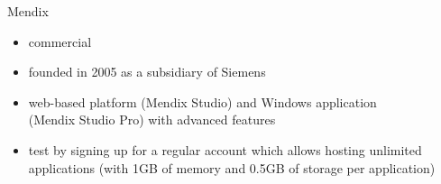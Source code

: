 \documentclass[aspectratio=169]{beamer}
\begin{document}
  \begin{frame}{Mendix}
    \begin{itemize}
      \item commercial
      \item founded in 2005 as a subsidiary of Siemens
      \item web-based platform (Mendix Studio) and Windows application \\
            (Mendix Studio Pro) with advanced features
      \item test by signing up for a regular account which allows hosting unlimited applications (with 1GB of memory and 0.5GB of storage per application)
    \end{itemize}
  \end{frame}
\end{document}
